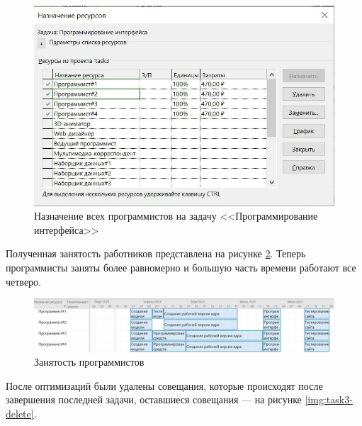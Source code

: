 \begin{figure}[H]
	\begin{center}
		\includegraphics[scale=0.25]{inc/img/task3-resources.jpg}
	\end{center}
	\captionsetup{justification=centering}
	\caption{Назначение всех программистов на задачу <<Программирование интерфейса>>}
	\label{img:task3-resources}
\end{figure}

Полученная занятость работников представлена на рисунке \ref{img:task3-programmers-after}. Теперь программисты заняты более равномерно и большую часть времени работают все четверо.

\begin{figure}[H]
	\begin{center}
		\includegraphics[scale=0.3]{inc/img/task3-programmers-after.jpg}
	\end{center}
	\captionsetup{justification=centering}
	\caption{Занятость программистов}
	\label{img:task3-programmers-after}
\end{figure}

После оптимизаций были удалены совещания, которые происходят после завершения последней задачи, оставшиеся совещания --- на рисунке \ref{img:task3-delete}.

